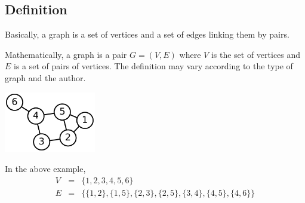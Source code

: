 \subsection{Definition}

Basically, a graph is a set of vertices and a set of edges
linking them by pairs.

Mathematically, a graph is a pair $G = (V,E)$
where $V$ is the set of vertices and
$E$ is a set of pairs of vertices.
The definition may vary according to the type of graph and the author.

\begin{center}
    \includegraphics[width=0.3\textwidth]{img/6n-graph}
\end{center}

In the above example,
\[
    \begin{array}{lcl}
        V &=& \{1, 2, 3, 4, 5, 6\}\\[.4em]
        E &=& \big\{\{1,2\}, \{1,5\}, \{2,3\}, \{2,5\},
                   \{3,4\}, \{4,5\}, \{4,6\}
              \big\}\\
    \end{array}
\]
